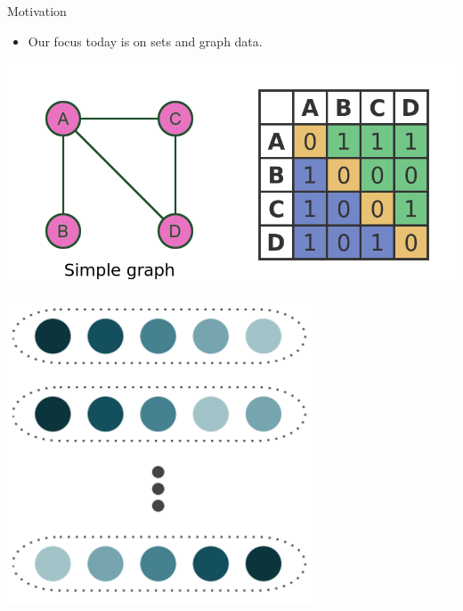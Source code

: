 \documentclass{beamer}
\begin{document}
\begin{frame}{Motivation}
    \begin{itemize}
        \setlength{\itemsep}{\fill}
        \item Our focus today is on sets and graph data.
        \end{itemize}
    \begin{center}
        \begin{minipage}[t]{0.69\textwidth}
            \centering
            \includegraphics[width=\textwidth]{../figures/graph_adj.png}
        \end{minipage}
        \hfill
        \begin{minipage}[t]{0.3\textwidth}
            \centering
            \includegraphics[width=\textwidth]{../figures/set.png}
        \end{minipage}
    \end{center}

\end{frame}
\end{document}
